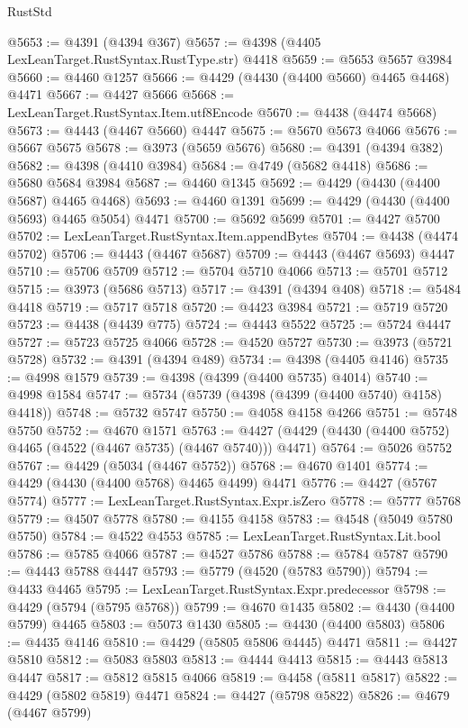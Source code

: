 \begin{lexlean}{RustStd}
\begin{coremodule}
{\begin{coremodule}
{{{{{{{{{{{{{{{{{{{{{{{{{{{{{{{{{{{{{{{{{{{{{{{{{{{{{{{{{{{{{{{{{{{{@5653 := @4391 (@4394 @367)
@5657 := @4398 (@4405 LexLeanTarget.RustSyntax.RustType.str) @4418
@5659 := @5653 @5657 @3984
@5660 := @4460 @1257
@5666 := @4429 (@4430 (@4400 @5660) @4465 @4468) @4471
@5667 := @4427 @5666
@5668 := LexLeanTarget.RustSyntax.Item.utf8Encode
@5670 := @4438 (@4474 @5668)
@5673 := @4443 (@4467 @5660) @4447
@5675 := @5670 @5673 @4066
@5676 := @5667 @5675
@5678 := @3973 (@5659 @5676)
@5680 := @4391 (@4394 @382)
@5682 := @4398 (@4410 @3984)
@5684 := @4749 (@5682 @4418)
@5686 := @5680 @5684 @3984
@5687 := @4460 @1345
@5692 := @4429 (@4430 (@4400 @5687) @4465 @4468)
@5693 := @4460 @1391
@5699 := @4429 (@4430 (@4400 @5693) @4465 @5054) @4471
@5700 := @5692 @5699
@5701 := @4427 @5700
@5702 := LexLeanTarget.RustSyntax.Item.appendBytes
@5704 := @4438 (@4474 @5702)
@5706 := @4443 (@4467 @5687)
@5709 := @4443 (@4467 @5693) @4447
@5710 := @5706 @5709
@5712 := @5704 @5710 @4066
@5713 := @5701 @5712
@5715 := @3973 (@5686 @5713)
@5717 := @4391 (@4394 @408)
@5718 := @5484 @4418
@5719 := @5717 @5718
@5720 := @4423 @3984
@5721 := @5719 @5720
@5723 := @4438 (@4439 @775)
@5724 := @4443 @5522
@5725 := @5724 @4447
@5727 := @5723 @5725 @4066
@5728 := @4520 @5727
@5730 := @3973 (@5721 @5728)
@5732 := @4391 (@4394 @489)
@5734 := @4398 (@4405 @4146)
@5735 := @4998 @1579
@5739 := @4398 (@4399 (@4400 @5735) @4014)
@5740 := @4998 @1584
@5747 := @5734 (@5739 (@4398 (@4399 (@4400 @5740) @4158) @4418))
@5748 := @5732 @5747
@5750 := @4058 @4158 @4266
@5751 := @5748 @5750
@5752 := @4670 @1571
@5763 := @4427 (@4429 (@4430 (@4400 @5752) @4465 (@4522 (@4467 @5735) (@4467 @5740))) @4471)
@5764 := @5026 @5752
@5767 := @4429 (@5034 (@4467 @5752))
@5768 := @4670 @1401
@5774 := @4429 (@4430 (@4400 @5768) @4465 @4499) @4471
@5776 := @4427 (@5767 @5774)
@5777 := LexLeanTarget.RustSyntax.Expr.isZero
@5778 := @5777 @5768
@5779 := @4507 @5778
@5780 := @4155 @4158
@5783 := @4548 (@5049 @5780 @5750)
@5784 := @4522 @4553
@5785 := LexLeanTarget.RustSyntax.Lit.bool
@5786 := @5785 @4066
@5787 := @4527 @5786
@5788 := @5784 @5787
@5790 := @4443 @5788 @4447
@5793 := @5779 (@4520 (@5783 @5790))
@5794 := @4433 @4465
@5795 := LexLeanTarget.RustSyntax.Expr.predecessor
@5798 := @4429 (@5794 (@5795 @5768))
@5799 := @4670 @1435
@5802 := @4430 (@4400 @5799) @4465
@5803 := @5073 @1430
@5805 := @4430 (@4400 @5803)
@5806 := @4435 @4146
@5810 := @4429 (@5805 @5806 @4445) @4471
@5811 := @4427 @5810
@5812 := @5083 @5803
@5813 := @4444 @4413
@5815 := @4443 @5813 @4447
@5817 := @5812 @5815 @4066
@5819 := @4458 (@5811 @5817)
@5822 := @4429 (@5802 @5819) @4471
@5824 := @4427 (@5798 @5822)
@5826 := @4679 (@4467 @5799)
}}}}}}}}}}}}}}}}}}}}}}}}}}}}}}}}}}}}}}}}}}}}}}}}}}}}}}}}}}}}}}}}}}}}
\end{coremodule}}
\end{coremodule}
\end{lexlean}
